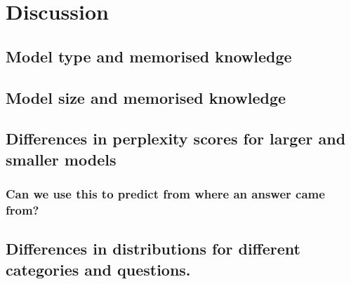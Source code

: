 \section{Discussion}
\label{discussion}

\subsection{Model type and memorised knowledge}
\label{model_type_parametric}

\subsection{Model size and memorised knowledge}
\label{model_size_parametric}

\subsection{Differences in perplexity scores for larger and smaller models}

\subsubsection{Can we use this to predict from where an answer came from?}

\subsection{Differences in distributions for different categories and questions.}
